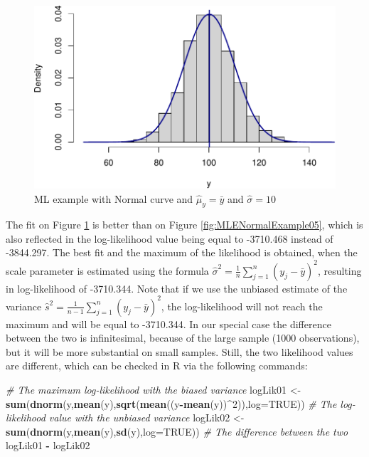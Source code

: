 \documentclass[
]{book}
\newenvironment{Shaded}{\begin{snugshade}}{\end{snugshade}}
\newcommand{\CommentTok}[1]{\textcolor[rgb]{0.56,0.35,0.01}{\textit{#1}}}
\newcommand{\DataTypeTok}[1]{\textcolor[rgb]{0.13,0.29,0.53}{#1}}
\newcommand{\DecValTok}[1]{\textcolor[rgb]{0.00,0.00,0.81}{#1}}
\newcommand{\KeywordTok}[1]{\textcolor[rgb]{0.13,0.29,0.53}{\textbf{#1}}}
\newcommand{\NormalTok}[1]{#1}
\newcommand{\OperatorTok}[1]{\textcolor[rgb]{0.81,0.36,0.00}{\textbf{#1}}}
\newcommand{\OtherTok}[1]{\textcolor[rgb]{0.56,0.35,0.01}{#1}}
\newcommand{\StringTok}[1]{\textcolor[rgb]{0.31,0.60,0.02}{#1}}
\theoremstyle{definition}
\theoremstyle{definition}
\theoremstyle{definition}
\theoremstyle{definition}
\theoremstyle{remark}
\begin{document}
\begin{figure}
\centering
\includegraphics{Svetunkov---Statistics-for-Business-Analytics_files/figure-latex/MLENormalExample06-1.pdf}
\caption{\label{fig:MLENormalExample06}ML example with Normal curve and \(\hat{\mu}_y=\bar{y}\) and \(\hat{\sigma}=10\)}
\end{figure}

The fit on Figure \ref{fig:MLENormalExample06} is better than on Figure \ref{fig:MLENormalExample05}, which is also reflected in the log-likelihood value being equal to -3710.468 instead of -3844.297. The best fit and the maximum of the likelihood is obtained, when the scale parameter is estimated using the formula \(\hat{\sigma}^2 = \frac{1}{n}\sum_{j=1}^n\left(y_j - \bar{y}\right)^2\), resulting in log-likelihood of -3710.344. Note that if we use the unbiased estimate of the variance \(\hat{s}^2 = \frac{1}{n-1}\sum_{j=1}^n\left(y_j - \bar{y}\right)^2\), the log-likelihood will not reach the maximum and will be equal to -3710.344. In our special case the difference between the two is infinitesimal, because of the large sample (1000 observations), but it will be more substantial on small samples. Still, the two likelihood values are different, which can be checked in R via the following commands:

\begin{Shaded}
\begin{Highlighting}[]
\CommentTok{\# The maximum log{-}likelihood with the biased variance}
\NormalTok{logLik01 \textless{}{-}}\StringTok{ }\KeywordTok{sum}\NormalTok{(}\KeywordTok{dnorm}\NormalTok{(y,}\KeywordTok{mean}\NormalTok{(y),}\KeywordTok{sqrt}\NormalTok{(}\KeywordTok{mean}\NormalTok{((y}\OperatorTok{{-}}\KeywordTok{mean}\NormalTok{(y))}\OperatorTok{\^{}}\DecValTok{2}\NormalTok{)),}\DataTypeTok{log=}\OtherTok{TRUE}\NormalTok{))}
\CommentTok{\# The log{-}likelihood value with the unbiased variance}
\NormalTok{logLik02 \textless{}{-}}\StringTok{ }\KeywordTok{sum}\NormalTok{(}\KeywordTok{dnorm}\NormalTok{(y,}\KeywordTok{mean}\NormalTok{(y),}\KeywordTok{sd}\NormalTok{(y),}\DataTypeTok{log=}\OtherTok{TRUE}\NormalTok{))}
\CommentTok{\# The difference between the two}
\NormalTok{logLik01 }\OperatorTok{{-}}\StringTok{ }\NormalTok{logLik02}
\end{Highlighting}
\end{Shaded}
\end{document}
